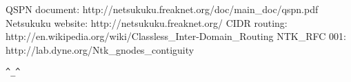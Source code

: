\documentclass[a4paper]{article}
\newcommand{\href}[2]{ #1 }
\begin{document}
\begin{thebibliography}{99}
	 QSPN document:
		\href{http://netsukuku.freaknet.org/doc/main\_doc/qspn.pdf}{qspn.pdf}
	 Netsukuku website:
		\href{http://netsukuku.freaknet.org/}{http://netsukuku.freaknet.org/}
	 CIDR routing:
		\href{http://en.wikipedia.org/wiki/Classless\_Inter-Domain\_Routing}{Classless\_Inter-Domain\_Routing in Wikipedia}
	 NTK\_RFC 001:
		\href{http://lab.dyne.org/Ntk\_gnodes\_contiguity}{Gnode contiguity}
\end{thebibliography}
\newpage

\begin{center}
\verb|^_^|
\end{center}
\end{document}
